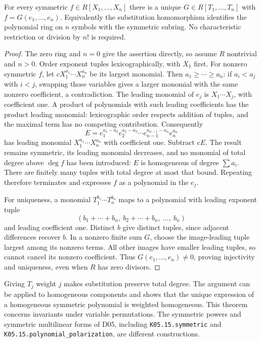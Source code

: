 \begin{theorem}\label{thm:symmetric-polynomials}
For every symmetric $f\in R[X_1,\ldots,X_n]$ there is a unique
$G\in R[T_1,\ldots,T_n]$ with $f=G(e_1,\ldots,e_n)$.
Equivalently the substitution homomorphism identifies the polynomial
ring on $n$ symbols with the symmetric subring. No characteristic
restriction or division by $n!$ is required.
\end{theorem}
\begin{proof}
The zero ring and $n=0$ give the assertion directly, so assume $R$
nontrivial and $n>0$. Order exponent tuples lexicographically, with
$X_1$ first. For nonzero symmetric $f$, let $cX_1^{a_1}\cdots X_n^{a_n}$
be its largest monomial. Then $a_1\ge\cdots\ge a_n$:
if $a_i<a_j$ with $i<j$, swapping those variables gives a larger
monomial with the same nonzero coefficient, a contradiction.
The leading monomial of $e_j$ is $X_1\cdots X_j$, with coefficient
one. A product of polynomials with such leading coefficients has
the product leading monomial: lexicographic order respects addition
of tuples, and the maximal term has no competing contribution.
Consequently
\[
 E=e_1^{a_1-a_2}e_2^{a_2-a_3}\cdots e_{n-1}^{a_{n-1}-a_n}e_n^{a_n}
\]
has leading monomial $X_1^{a_1}\cdots X_n^{a_n}$ with coefficient
one. Subtract $cE$. The result remains symmetric, its leading
monomial decreases, and no monomial of total degree above $\deg f$
has been introduced: $E$ is homogeneous of degree $\sum a_i$.
There are finitely many tuples with total degree at most that bound.
Repeating therefore terminates and expresses $f$ as a polynomial
in the $e_j$.

For uniqueness, a monomial $T_1^{b_1}\cdots T_n^{b_n}$ maps to a
polynomial with leading exponent tuple
\[
 (b_1+\cdots+b_n,\ b_2+\cdots+b_n,\ \ldots,\ b_n)
\]
and leading coefficient one. Distinct $b$ give distinct tuples,
since adjacent differences recover $b$. In a nonzero finite sum
$G$, choose the image-leading tuple largest among its nonzero
terms. All other images have smaller leading tuples, so cannot
cancel its nonzero coefficient. Thus $G(e_1,\ldots,e_n)\ne0$,
proving injectivity and uniqueness, even when $R$ has zero divisors.
\end{proof}
Giving $T_j$ weight $j$ makes substitution preserve total degree.
The argument can be applied to homogeneous components and shows that
the unique expression of a homogeneous symmetric polynomial is
weighted homogeneous. This theorem concerns invariants under variable
permutations. The symmetric powers and symmetric multilinear forms
of D05, including \texttt{K05.15.symmetric} and
\texttt{K05.15.polynomial\_polarization}, are different constructions.

